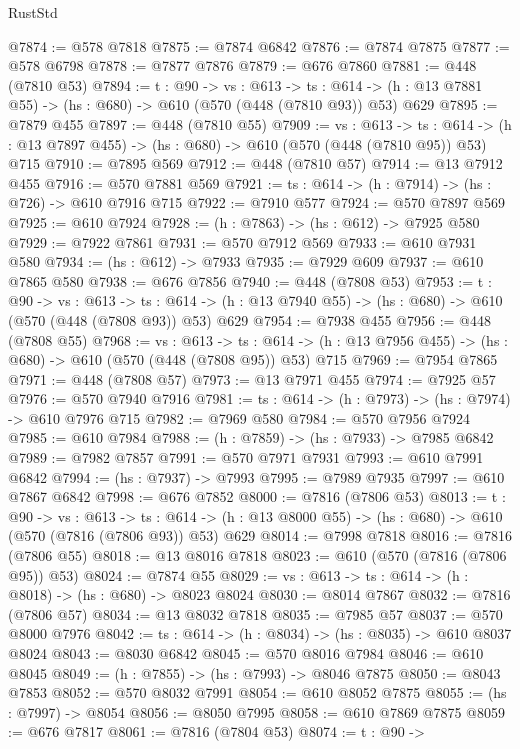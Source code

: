 \begin{lexlean}{RustStd}
\begin{coremodule}
@7874 := @578 @7818
@7875 := @7874 @6842
@7876 := @7874 @7875
@7877 := @578 @6798
@7878 := @7877 @7876
@7879 := @676 @7860
@7881 := @448 (@7810 @53)
@7894 := {t : @90} ->
  {vs : @613} ->
  {ts : @614} -> (h : @13 @7881 @55) -> (hs : @680) -> @610 (@570 (@448 (@7810 @93)) @53) @629
@7895 := @7879 @455
@7897 := @448 (@7810 @55)
@7909 := {vs : @613} ->
  {ts : @614} -> (h : @13 @7897 @455) -> (hs : @680) -> @610 (@570 (@448 (@7810 @95)) @53) @715
@7910 := @7895 @569
@7912 := @448 (@7810 @57)
@7914 := @13 @7912 @455
@7916 := @570 @7881 @569
@7921 := {ts : @614} -> (h : @7914) -> (hs : @726) -> @610 @7916 @715
@7922 := @7910 @577
@7924 := @570 @7897 @569
@7925 := @610 @7924
@7928 := (h : @7863) -> (hs : @612) -> @7925 @580
@7929 := @7922 @7861
@7931 := @570 @7912 @569
@7933 := @610 @7931 @580
@7934 := (hs : @612) -> @7933
@7935 := @7929 @609
@7937 := @610 @7865 @580
@7938 := @676 @7856
@7940 := @448 (@7808 @53)
@7953 := {t : @90} ->
  {vs : @613} ->
  {ts : @614} -> (h : @13 @7940 @55) -> (hs : @680) -> @610 (@570 (@448 (@7808 @93)) @53) @629
@7954 := @7938 @455
@7956 := @448 (@7808 @55)
@7968 := {vs : @613} ->
  {ts : @614} -> (h : @13 @7956 @455) -> (hs : @680) -> @610 (@570 (@448 (@7808 @95)) @53) @715
@7969 := @7954 @7865
@7971 := @448 (@7808 @57)
@7973 := @13 @7971 @455
@7974 := @7925 @57
@7976 := @570 @7940 @7916
@7981 := {ts : @614} -> (h : @7973) -> (hs : @7974) -> @610 @7976 @715
@7982 := @7969 @580
@7984 := @570 @7956 @7924
@7985 := @610 @7984
@7988 := (h : @7859) -> (hs : @7933) -> @7985 @6842
@7989 := @7982 @7857
@7991 := @570 @7971 @7931
@7993 := @610 @7991 @6842
@7994 := (hs : @7937) -> @7993
@7995 := @7989 @7935
@7997 := @610 @7867 @6842
@7998 := @676 @7852
@8000 := @7816 (@7806 @53)
@8013 := {t : @90} ->
  {vs : @613} ->
  {ts : @614} -> (h : @13 @8000 @55) -> (hs : @680) -> @610 (@570 (@7816 (@7806 @93)) @53) @629
@8014 := @7998 @7818
@8016 := @7816 (@7806 @55)
@8018 := @13 @8016 @7818
@8023 := @610 (@570 (@7816 (@7806 @95)) @53)
@8024 := @7874 @55
@8029 := {vs : @613} -> {ts : @614} -> (h : @8018) -> (hs : @680) -> @8023 @8024
@8030 := @8014 @7867
@8032 := @7816 (@7806 @57)
@8034 := @13 @8032 @7818
@8035 := @7985 @57
@8037 := @570 @8000 @7976
@8042 := {ts : @614} -> (h : @8034) -> (hs : @8035) -> @610 @8037 @8024
@8043 := @8030 @6842
@8045 := @570 @8016 @7984
@8046 := @610 @8045
@8049 := (h : @7855) -> (hs : @7993) -> @8046 @7875
@8050 := @8043 @7853
@8052 := @570 @8032 @7991
@8054 := @610 @8052 @7875
@8055 := (hs : @7997) -> @8054
@8056 := @8050 @7995
@8058 := @610 @7869 @7875
@8059 := @676 @7817
@8061 := @7816 (@7804 @53)
@8074 := {t : @90} ->

\end{coremodule}
\end{lexlean}
